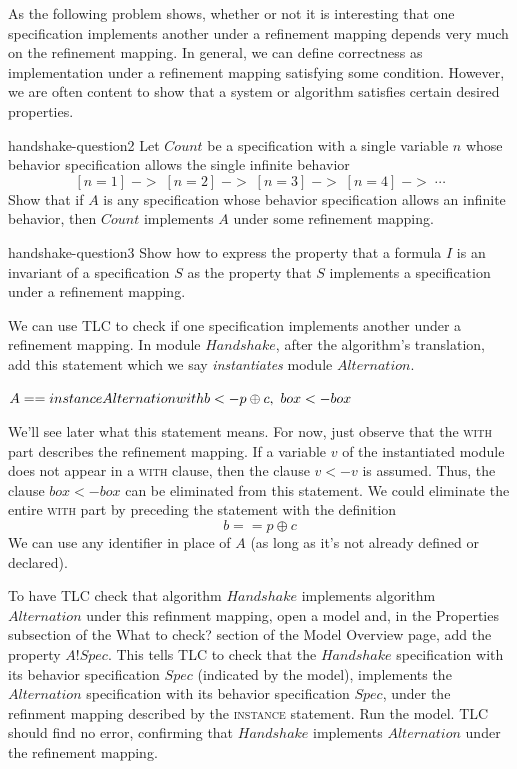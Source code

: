 \documentclass[fleqn,leqno]{article}
\begin{document}
As the following problem shows, whether or not it is interesting that
one specification implements another under a refinement mapping
depends very much on the refinement mapping.  In general, we can
define correctness as implementation under a refinement mapping
satisfying some condition.  However, we are often content to show that
a system or algorithm satisfies certain desired properties.

\begin{aquestion}{handshake-question2}
Let $Count$ be a specification with a single variable $n$ whose
behavior specification allows the single infinite behavior
 \[ [n = 1] \;->\; [n = 2] \;->\; [n = 3] \;->\; [n = 4] \;->\; \cdots
 \]
Show that if $A$ is any specification whose behavior specification allows
an infinite behavior, then $Count$ implements $A$ under some refinement
mapping.
\end{aquestion}

\vspace{-.5em}

\begin{aquestion}{handshake-question3}
Show how to express the property that a formula $I$ is an invariant of
a specification $S$ as the property that $S$ implements a specification
under a refinement mapping.
\end{aquestion}

We can use TLC to check if one specification implements another under
a refinement mapping.  In module $Handshake$, after the algorithm's
translation, add this statement which we say 
\emph{instantiates} module 
$Alternation$.%
\begin{display}
$A == \INSTANCE Alternation \WITH b <- p \oplus c,\  box <- box$
\end{display}
We'll see later what this statement means.  For now, just observe that
the \textsc{with} part describes the refinement mapping.  If a
variable $v$ of the instantiated module does not appear in a
\textsc{with} clause, then the clause $v <- v$ is assumed.  Thus, the
clause $box <- box$ can be eliminated from this statement.  We could
eliminate the entire \textsc{with} part by preceding the statement with
the definition
 \[ b == p \oplus c\]
We can use any identifier in place of $A$ (as long as it's not already
defined or declared).

\begin{sloppypar}
To have TLC 
check that algorithm $Handshake$ implements algorithm
$Alternation$ under this refinment mapping, open a model and, in the
\textsf{Properties} subsection of the \textsf{What to check?} section
of the \textsf{Model Overview} page, add the property $A!Spec$.  This
tells TLC to check that the $Handshake$ specification with its
behavior specification $Spec$ (indicated by the model), implements the
$Alternation$ specification with its behavior specification $Spec$,
under the refinment mapping described by the \textsc{instance}
statement.  Run the model.  TLC should find no error, confirming that
$Handshake$ implements $Alternation$ under the refinement mapping.
\end{sloppypar}
\end{document}
